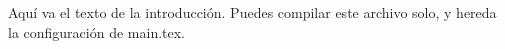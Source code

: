 \documentclass[../main.tex]{subfiles}
\begin{document}
Aquí va el texto de la introducción. 
Puedes compilar este archivo solo, y hereda la configuración de main.tex.
\end{document}
